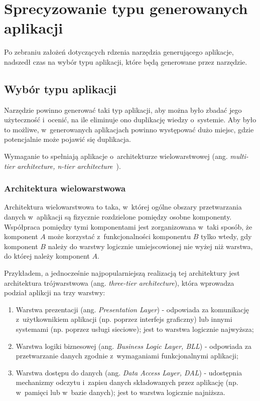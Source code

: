\chapter{Sprecyzowanie typu generowanych aplikacji} \label{chap:generated_app_type}

Po zebraniu założeń dotyczących rdzenia narzędzia generującego aplikacje, nadszedł czas na wybór typu aplikacji, które będą generowane przez narzędzie.



\section{Wybór typu aplikacji}

Narzędzie powinno generować taki typ aplikacji, aby można było zbadać jego użyteczność i~ocenić, na ile eliminuje ono duplikację wiedzy o~systemie.
Aby było to możliwe, w~generowanych aplikacjach powinno występować dużo miejsc, gdzie potencjalnie może pojawić się duplikacja.

Wymaganie to spełniają aplikacje o~architekturze wielowarstwowej (ang. \emph{multi-tier architecture, n-tier architecture}~\cite{ntier}).


\subsection{Architektura wielowarstwowa}

Architektura wielowarstwowa to taka, w~której ogólne obszary przetwarzania danych w~aplikacji są fizycznie rozdzielone pomiędzy osobne komponenty.
Współpraca pomiędzy tymi komponentami jest zorganizowana w~taki sposób, że komponent $A$ może korzystać z~funkcjonalności komponentu $B$ tylko wtedy, gdy komponent $B$ należy do warstwy logicznie umiejscowionej nie wyżej niż warstwa, do której należy komponent $A$.

Przykładem, a jednocześnie najpopularniejszą realizacją tej architektury jest architektura trójwarstwowa (ang. \emph{three-tier architecture}), która wprowadza podział aplikcji na trzy warstwy:

\begin{enumerate}
 \item Warstwa prezentacji (ang. \emph{Presentation Layer}) - odpowiada za komunikację z~użytkownikiem aplikacji (np. poprzez interfejs graficzny) lub innymi systemami (np. poprzez usługi sieciowe); jest to warstwa logicznie najwyższa;
 \item Warstwa logiki biznesowej (ang. \emph{Business Logic Layer, BLL}) - odpowiada za przetwarzanie danych zgodnie z~wymaganiami funkcjonalnymi aplikacji;
 \item Warstwa dostępu do danych (ang. \emph{Data Access Layer, DAL}) - udostępnia mechanizmy odczytu i~zapisu danych składowanych przez aplikację (np. w~pamięci lub w~bazie danych); jest to warstwa logicznie najniższa.
\end{enumerate}

